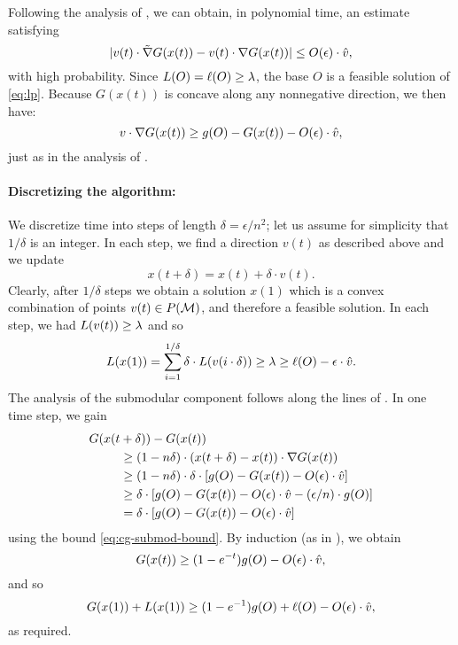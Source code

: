 \documentclass{article}
\theoremstyle{definition}
\begin{document}
Following the analysis of \cite{Calinescu2011}, we can obtain, in polynomial time, an estimate satisfying
\begin{equation*}
\label{eq:cg-error-bound}
|v(t) \cdot \tilde{\nabla} G(x(t)) - v(t) \cdot \nabla G(x(t))| \le O(\epsilon) \cdot \hat{v},
\end{equation*}
with high probability.  Since $L(O) = \ell(O) \ge \lambda$, the base $O$ is a feasible solution of \eqref{eq:lp}.  Because $G(x(t))$ is concave along any nonnegative direction, we then have:
\begin{equation}
\label{eq:cg-submod-bound}
v \cdot \nabla G(x(t)) \ge g(O) - G(x(t)) - O(\epsilon)\cdot \hat{v},
\end{equation}
just as in the analysis of \cite{Calinescu2011}.

\paragraph{Discretizing the algorithm:}
We discretize time into steps of length $\delta=\epsilon/n^{2}$; let us assume for simplicity that $1/\delta$ is an integer.
In each step, we find a direction $v(t)$ as described above and we update
\[
x(t+\delta) = x(t) + \delta \cdot v(t).
\]
Clearly, after $1/\delta$ steps we obtain a solution $x(1)$ which is a convex combination of points $v(t) \in P(\mathcal{M})$, and therefore a feasible solution. In each step, we had $L(v(t)) \geq \lambda$ and so
\[
L(x(1)) = \sum_{i=1}^{1/\delta} \delta \cdot L(v(i\cdot \delta)) \geq \lambda \geq \ell(O) - \epsilon\cdot \hat{v}.
\]
The analysis of the submodular component follows along the lines of \cite{Calinescu2011}.  In one time step, we gain
\begin{align*}
G(x(t&+\delta)) - G(x(t)) \\
& \geq (1 - n\delta) \cdot (x(t+\delta) - x(t)) \cdot \nabla G(x(t)) \\
& \geq (1 - n\delta)\cdot \delta \cdot [g(O) - G(x(t)) - O(\epsilon)\cdot \hat{v}] \\
& \geq \delta\cdot [g(O) - G(x(t)) - O(\epsilon)\cdot \hat{v} - (\epsilon/n)\cdot g(O)] \\
& = \delta\cdot [g(O) - G(x(t)) - O(\epsilon)\cdot \hat{v}]
\end{align*}
using the bound \eqref{eq:cg-submod-bound}. By induction (as in \cite{Calinescu2011}), we obtain
$$ G(x(t)) \geq (1 - e^{-t})g(O) - O(\epsilon)\cdot\hat{v},$$
and so $$G(x(1)) + L(x(1)) \ge (1 - e^{-1})g(O) + \ell(O) - O(\epsilon)\cdot\hat{v},$$ as required.
\end{document}
